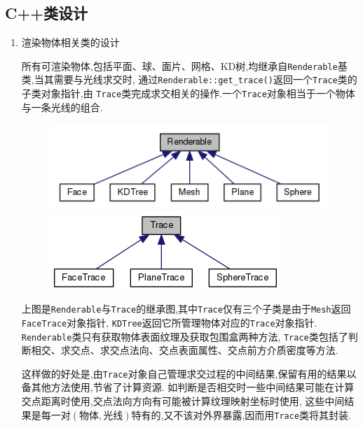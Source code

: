 \subsection{C++类设计}
\begin{enumerate}
  \item 渲染物体相关类的设计

    所有可渲染物体,包括平面、球、面片、网格、KD树,均继承自\verb|Renderable|基类,当其需要与光线求交时,
    通过\verb|Renderable::get_trace()|返回一个\verb|Trace|类的子类对象指针,由
    \verb|Trace|类完成求交相关的操作.一个\verb|Trace|对象相当于一个物体与一条光线的组合.

    \begin{figure}[H]
      \begin{minipage}[b]{0.46\linewidth}
        \centering
        \includegraphics[width=\textwidth]{res/renderable_inherit.png}
      \end{minipage}
      \begin{minipage}[b]{0.46\linewidth}
        \centering
        \includegraphics[width=\textwidth]{res/trace_inherit.png}
      \end{minipage}
    \end{figure}

    上图是\verb|Renderable|与\verb|Trace|的继承图,其中\verb|Trace|仅有三个子类是由于\verb|Mesh|返回\verb|FaceTrace|对象指针,
    \verb|KDTree|返回它所管理物体对应的\verb|Trace|对象指针.
    \verb|Renderable|类只有获取物体表面纹理及获取包围盒两种方法,
    \verb|Trace|类包括了判断相交、求交点、求交点法向、交点表面属性、交点前方介质密度等方法.

    这样做的好处是,由\verb|Trace|对象自己管理求交过程的中间结果,保留有用的结果以备其他方法使用,节省了计算资源.
    如判断是否相交时一些中间结果可能在计算交点距离时使用,交点法向方向有可能被计算纹理映射坐标时使用,
    这些中间结果是每一对$ (物体,光线)$特有的,又不该对外界暴露,因而用\verb|Trace|类将其封装.


\end{enumerate}

